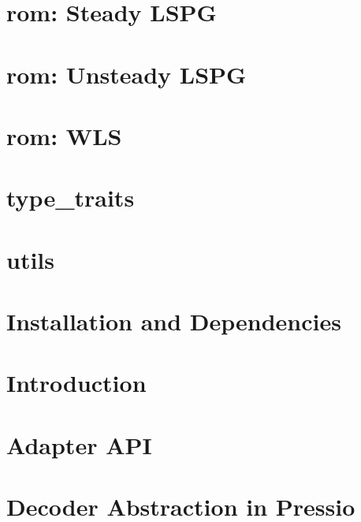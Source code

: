 \let\mypdfximage\pdfximage\def\pdfximage{\immediate\mypdfximage}\documentclass[twoside]{book}
\newcommand{\+}{\discretionary{\mbox{\scriptsize$\hookleftarrow$}}{}{}}
\begin{document}
\chapter{rom\+: Steady LSPG}
\label{md_pages_components_rom_lspg_steady}

\chapter{rom\+: Unsteady LSPG}
\label{md_pages_components_rom_lspg_unsteady}

\chapter{rom\+: WLS}
\label{md_pages_components_rom_wls}

\chapter{type\+\_\+traits}
\label{md_pages_components_type_traits}

\chapter{utils}
\label{md_pages_components_utils}

\chapter{Installation and Dependencies}
\label{md_pages_installation}

\chapter{Introduction}
\label{md_pages_introduction}

\chapter{Adapter API}
\label{md_pages_revise_and_pick_coreconcepts_adapter_api}

\chapter{Decoder Abstraction in Pressio}
\label{md_pages_revise_and_pick_coreconcepts_decoder}

\end{document}
